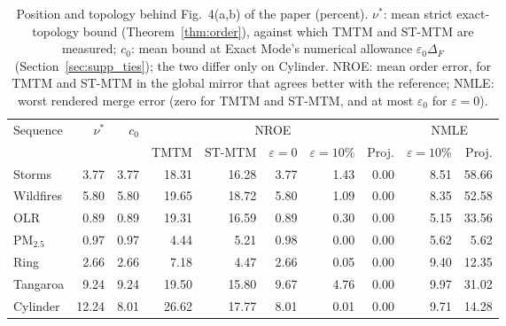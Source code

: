 \begin{table}[H]
\centering\small\setlength{\tabcolsep}{3.2pt}
\caption{Position and topology behind Fig.~4(a,b) of the paper (percent). $\nu^*$: mean strict exact-topology bound (Theorem~\ref{thm:order}), against which TMTM and ST-MTM are measured; $c_0$: mean bound at Exact Mode\textquoteright s numerical allowance $\varepsilon_0\Delta_F$ (Section~\ref{sec:supp_ties}); the two differ only on Cylinder. NROE: mean order error, for TMTM and ST-MTM in the global mirror that agrees better with the reference; NMLE: worst rendered merge error (zero for TMTM and ST-MTM, and at most $\varepsilon_0$ for $\varepsilon=0$).}\label{tab:supp_values_position}
\begin{tabular}{lrrrrrrrrr}\toprule
Sequence & $\nu^*$ & $c_0$ & \multicolumn{5}{c}{NROE} & \multicolumn{2}{c}{NMLE}\\\cmidrule(lr){4-8}\cmidrule(lr){9-10}
 &  &  & TMTM & ST-MTM & $\varepsilon{=}0$ & $\varepsilon{=}10\%$ & Proj. & $\varepsilon{=}10\%$ & Proj.\\\midrule
Storms & 3.77 & 3.77 & 18.31 & 16.28 & 3.77 & 1.43 & 0.00 & 8.51 & 58.66\\
Wildfires & 5.80 & 5.80 & 19.65 & 18.72 & 5.80 & 1.09 & 0.00 & 8.35 & 52.58\\
OLR & 0.89 & 0.89 & 19.31 & 16.59 & 0.89 & 0.30 & 0.00 & 5.15 & 33.56\\
PM$_{2.5}$ & 0.97 & 0.97 & 4.44 & 5.21 & 0.98 & 0.00 & 0.00 & 5.62 & 5.62\\
Ring & 2.66 & 2.66 & 7.18 & 4.47 & 2.66 & 0.05 & 0.00 & 9.40 & 12.35\\
Tangaroa & 9.24 & 9.24 & 19.50 & 15.80 & 9.67 & 4.76 & 0.00 & 9.97 & 31.02\\
Cylinder & 12.24 & 8.01 & 26.62 & 17.77 & 8.01 & 0.01 & 0.00 & 9.71 & 14.28\\
\bottomrule\end{tabular}
\end{table}

